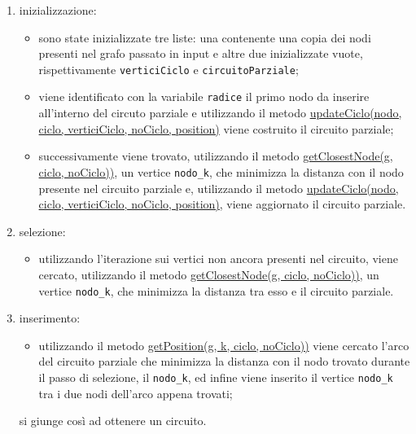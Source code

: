 \begin{enumerate}

    \item inizializzazione: 

    \begin{itemize}
        \item sono state inizializzate tre liste: una contenente una copia dei nodi presenti nel grafo passato in input e altre due inizializzate vuote, rispettivamente \texttt{verticiCiclo} e \texttt{circuitoParziale};
        \item viene identificato con la variabile \texttt{radice} il primo nodo da inserire all'interno del circuto parziale e utilizzando il metodo \hyperlink{updateCiclo}{updateCiclo(nodo, ciclo, verticiCiclo, noCiclo, position)} viene costruito il circuito parziale;
        \item successivamente viene trovato, utilizzando il metodo \hyperlink{getClosestNode}{getClosestNode(g, ciclo, noCiclo))}, un vertice \texttt{nodo\_k}, che minimizza la distanza con il nodo presente nel circuito parziale e, utilizzando il metodo \hyperlink{updateCiclo}{updateCiclo(nodo, ciclo, verticiCiclo, noCiclo, position)}, viene aggiornato il circuito parziale.
    \end{itemize}

    \item selezione:

    \begin{itemize}
        \item utilizzando l'iterazione sui vertici non ancora presenti nel circuito, viene cercato, utilizzando il metodo \hyperlink{getClosestNode}{getClosestNode(g, ciclo, noCiclo))}, un vertice \texttt{nodo\_k}, che minimizza la distanza tra esso e il circuito parziale.
    \end{itemize}

    \item inserimento:

    \begin{itemize}
        \item utilizzando il metodo \hyperlink{getPosition}{getPosition(g, k, ciclo, noCiclo))} viene cercato l'arco del circuito parziale che minimizza la distanza con il nodo trovato durante il passo di selezione, il \texttt{nodo\_k}, ed infine viene inserito il vertice \texttt{nodo\_k} tra i due nodi dell'arco appena trovati;
    \end{itemize}

    si giunge così ad ottenere un circuito.
    
\end{enumerate}
